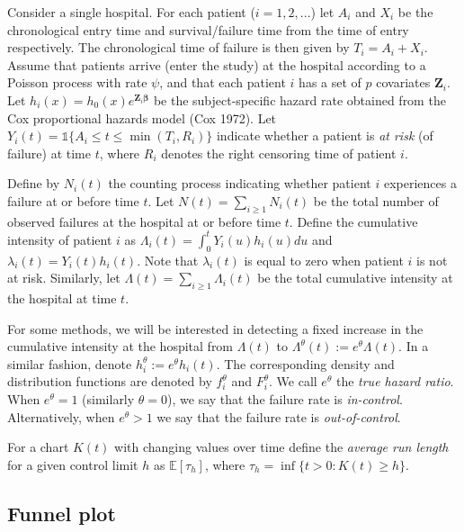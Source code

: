Consider a single hospital. For each patient (\(i = 1,2,...\)) let \(A_i\) and \(X_i\) be the chronological entry time and survival/failure time from the time of entry respectively. The chronological time of failure is then given by \(T_i = A_i + X_i\). Assume that patients arrive (enter the study) at the hospital according to a Poisson process with rate \(\psi\), and that each patient \(i\) has a set of \(p\) covariates \(\mathbf{Z}_i\). Let \(h_i(x) = h_0(x) e^{\mathbf{Z}_i \pmb{\beta}}\) be the subject-specific hazard rate obtained from the Cox proportional hazards model (Cox 1972). Let \(Y_i(t) = \mathbb{1} \{ A_i \leq t \leq \min(T_i, R_i) \}\) indicate whether a patient is \emph{at risk} (of failure) at time \(t\), where \(R_i\) denotes the right censoring time of patient \(i\).

Define by \(N_i(t)\) the counting process indicating whether patient \(i\) experiences a failure at or before time \(t\). Let \(N(t) = \sum_{i \geq 1} N_i(t)\) be the total number of observed failures at the hospital at or before time \(t\). Define the cumulative intensity of patient \(i\) as \(\Lambda_i(t) = \int_0^t Y_i(u) h_i(u) du\) and \(\lambda_i(t) = Y_i(t) h_i(t)\). Note that \(\lambda_i(t)\) is equal to zero when patient \(i\) is not at risk. Similarly, let \(\Lambda(t) = \sum_{i \geq 1} \Lambda_i(t)\) be the total cumulative intensity at the hospital at time \(t\).

For some methods, we will be interested in detecting a fixed increase in the cumulative intensity at the hospital from \(\Lambda(t)\) to \(\Lambda^\theta(t) := e^\theta \Lambda(t)\). In a similar fashion, denote \(h_i^\theta := e^\theta h_i(t)\). The corresponding density and distribution functions are denoted by \(f_i^\theta\) and \(F_i^\theta\). We call \(e^\theta\) the \emph{true hazard ratio}. When \(e^\theta = 1\) (similarly \(\theta = 0\)), we say that the failure rate is \emph{in-control}. Alternatively, when \(e^\theta > 1\) we say that the failure rate is \emph{out-of-control}.

For a chart \(K(t)\) with changing values over time define the \emph{average run length} for a given control limit \(h\) as \(\mathbb{E}[\tau_h]\), where \(\tau_h = \inf\{t > 0: K(t) \geq h\}\).

\hypertarget{sec:FunnelPlot}{%
\subsection{Funnel plot}\label{sec:FunnelPlot}}

